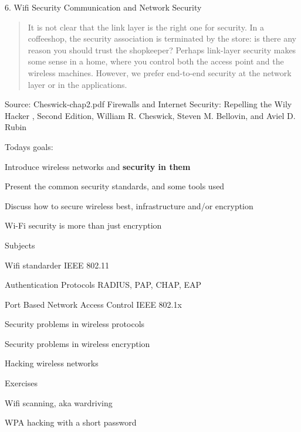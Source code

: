 \documentclass[Screen16to9,17pt]{foils}
\begin{document}
\mytitlepage
{6. Wifi Security}
{Communication and Network Security \the\year}



\begin{quote}
It is not clear that the link layer is the right one for security. In a coffeeshop, the security association is terminated by the store: is there any reason you should trust the shopkeeper? Perhaps link-layer security makes some sense in a home, where you control both the access point and the wireless machines. However, we prefer end-to-end security at the network layer or in the
applications.
\end{quote} Source: Cheswick-chap2.pdf Firewalls and Internet Security: Repelling the Wily Hacker , Second Edition, William R. Cheswick, Steven M. Bellovin, and Aviel D. Rubin

Todays goals:
\begin{list2}
\item Introduce wireless networks and {\bf security in them}
\item Present the common security standards, and some tools used
\item Discuss how to secure wireless best, infrastructure and/or encryption
\item Wi-Fi security is more than just encryption
\end{list2}


\begin{list1}
\item Subjects
\begin{list2}
\item Wifi standarder IEEE 802.11
\item Authentication Protocols RADIUS, PAP, CHAP, EAP
\item Port Based Network Access Control IEEE 802.1x
\item Security problems in wireless protocols
\item Security problems in wireless encryption
\item Hacking wireless networks
\end{list2}
\item Exercises
\begin{list2}
\item Wifi scanning, aka wardriving
\item WPA hacking with a short password
\end{list2}
\end{list1}
\end{document}
